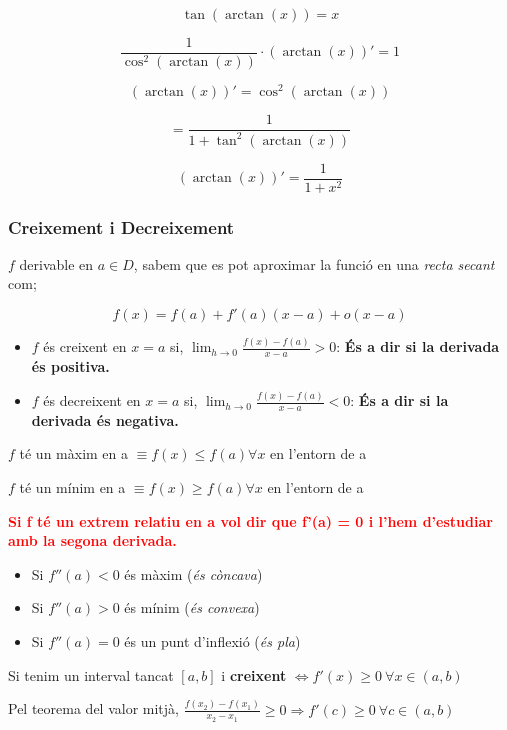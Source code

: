 \documentclass[12pt]{article}
\begin{document}
\begin{examplebox}{}
    \[\tan(\arctan(x))=x\]

    \[\frac{1}{\cos^2(\arctan(x))}\cdot(\arctan(x))'=1\]

    \[(\arctan(x))'=\cos^2(\arctan(x))\]

    \[=\frac{1}{1+\tan^2(\arctan(x))}\]

    \[\boxed{(\arctan(x))'=\frac{1}{1+x^2}}\]
\end{examplebox}

\subsubsection{Creixement i Decreixement}

$f$ derivable en $a\in D$, sabem que es pot aproximar la funció en una \textit{recta secant} com;

\[f(x)  = f(a) + f'(a)(x-a)+o(x-a)\]

\begin{itemize}
    \item $f$ és creixent en $x = a$ si, $\lim_{h\rightarrow 0} \frac{f(x) - f(a)}{x-a} >0$: \textbf{És a dir si la derivada és positiva.}
    \item $f$ és decreixent en $x = a$ si, $\lim_{h\rightarrow 0} \frac{f(x) - f(a)}{x-a} <0$: \textbf{És a dir si la derivada és negativa.}
\end{itemize}

$f$ té un màxim en a $\equiv f(x) \leq f(a) \forall x$ en l'entorn de a 

$f$ té un mínim en a $\equiv f(x) \geq f(a) \forall x$ en l'entorn de a 

\textcolor{red}{\textbf{Si f té un extrem relatiu en a vol dir que f'(a) = 0 i l'hem d'estudiar amb la segona derivada.}}

\begin{itemize}
    \item Si $f''(a) <0$ és màxim (\textit{és còncava})
    \item Si $f''(a) >0$ és mínim (\textit{és convexa})
    \item Si $f''(a)=0$ és un punt d'inflexió (\textit{és pla})
\end{itemize}

Si tenim un interval tancat $[a,b]$ i \textbf{creixent} $\Leftrightarrow f'(x)\geq 0 \ \forall x\in(a,b)$

Pel teorema del valor mitjà, $\frac{f(x_2)-f(x_1)}{x_2-x_1}\geq 0 \Rightarrow f'(c)\geq 0 \ \forall c\in(a,b)$
\end{document}
